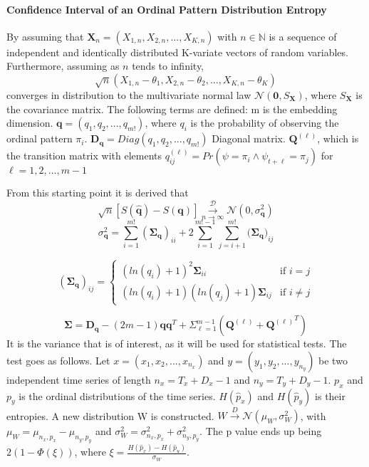 \paragraph{Confidence Interval of an Ordinal Pattern Distribution Entropy}
By assuming that $\textbf{X}_n = (X_{1,n},X_{2,n},...,X_{K,n})$ with $n \in \mathbb{N}$ is a sequence of independent and identically distributed K-variate vectors of random variables. Furthermore, assuming as $n$ tends to infinity, $$\sqrt{n}(X_{1,n}-\theta_1,X_{2,n}-\theta_2,...,X_{K,n}-\theta_K)$$ 
converges in distribution to the multivariate normal law $\mathscr{N}(\textbf{0},S_{\textbf{X}})$, where $S_{\textbf{X}}$ is the covariance matrix. The following terms are defined:
m is the embedding dimension.
$\mathbf{q}=(q_1,q_2,...,q_{m!})$, where $q_i$ is the probability of observing the ordinal pattern $\pi_i$.
$\mathbf{D_q}=Diag(q_1,q_2,...,q_{m!})$ Diagonal matrix.
$\mathbf{Q}^{(\ell)}$, which is the transition matrix with elements
$q_{ij}^{(\ell)}=Pr(\psi =\pi_i \wedge \psi_{t+\ell}=\pi_j)$
for $\ell = 1,2,...,m-1$


From this starting point it is derived that 
$$\sqrt{n}[S(\hat{\textbf{q}})-S(\textbf{q})] \overset{\mathscr{D}}{\underset{n\rightarrow\infty}{\longrightarrow}}\mathscr{N}(0,\sigma_{\textbf{q}}^2)$$
$$ \sigma_{\textbf{q}}^2=\sum_{i=1}^{m!}(\mathbf{\Sigma_q})_{ii}+2\sum_{i=1}^{m!-1}\sum_{j=i+1}^{m!}(\bm{\Sigma_q)}_{ij}$$

\begin{displaymath}
  (\mathbf{\Sigma_q})_{ij} = \left\{
    \begin{array}{lr}
      (ln(q_i)+1)^2\mathbf{\Sigma}_{ii} & \text{if $i=j$}\\
      (ln(q_i)+1)(ln(q_j)+1)\mathbf{\Sigma}_{ij} & \text{if $i \neq j$}
    \end{array}
  \right.
\end{displaymath} 

$$\mathbf{\Sigma}=\mathbf{D_q}-(2m-1)\mathbf{qq}^T+\Sigma_{\ell=1}^{m-1}(\mathbf{Q}^{(\ell)}+{\mathbf{Q}^{(\ell)}}^T)$$  
\cite{Rey2023}It is the variance that is of interest, as it will be used for statistical tests. The test goes as follows. Let $x=(x_1,x_2,...,x_{n_x})$ and $y=(y_1,y_2,...,y_{n_y})$ be two independent time series of length $n_x=T_x+D_x-1$ and $n_y=T_y+D_y-1$. $p_x$ and $p_y$ is the ordinal distributions of the time series. $H(\hat{p}_x)$ and $H(\hat{p}_y)$ is their entropies. A new distribution W is constructed. $W \overset{D}{\rightarrow}\mathscr{N}(\mu_W,\sigma_W^2)$, with $\mu_W=\mu_{n_x,p_x}-\mu_{n_y,p_y}$ and $\sigma_W^2=\sigma_{n_x,p_x}^2+\sigma_{n_y,p_y}^2$. 
The p value ends up being $2(1-\Phi(\xi))$, where $\xi = \frac{H(\hat{p}_x)-H(\hat{p}_u)}{\sigma_W}$. \cite{Chagas2022}

